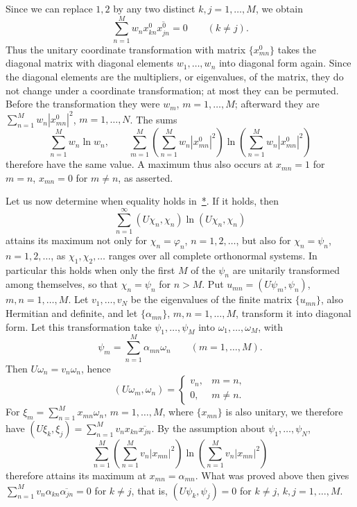 \documentclass[fontsize=13pt,twoside,openany,headings=normal,parskip=false,bookmarkpackage=false,DIV=calc]{scrbook}
\begin{document}
\hypertarget{origpage-205}{}%
Since we can replace $1,2$ by any two distinct $k,j=1,\ldots,M$, we obtain
\[
\sum_{n=1}^Mw_nx^0_{kn}\overline{x^0_{jn}}=0\qquad(k\ne j).
\]
Thus the unitary coordinate transformation with matrix $\{x^0_{mn}\}$ takes the diagonal matrix with diagonal elements $w_1,\ldots,w_n$ into diagonal form again. Since the diagonal elements are the multipliers, or eigenvalues, of the matrix, they do not change under a coordinate transformation; at most they can be permuted. Before the transformation they were $w_m$, $m=1,\ldots,M$; afterward they are $\sum_{n=1}^Mw_n|x^0_{mn}|^2$, $m=1,\ldots,N$. The sums
\[
\sum_{n=1}^Mw_n\ln w_n,\qquad
\sum_{m=1}^M\left(\sum_{n=1}^Mw_n|x^0_{mn}|^2\right)\ln\left(\sum_{n=1}^Mw_n|x^0_{mn}|^2\right)
\]
therefore have the same value. A maximum thus also occurs at $x_{mn}=1$ for $m=n$, $x_{mn}=0$ for $m\ne n$, as asserted.

Let us now determine when equality holds in~\hyperref[eq:V.3.star]{*}. If it holds, then
\[
\sum_{n=1}^{\infty}(U\chi_n,\chi_n)\ln(U\chi_n,\chi_n)
\]
attains its maximum not only for $\chi_n=\varphi_n$, $n=1,2,\ldots$, but also for $\chi_n=\psi_n$, $n=1,2,\ldots$, as $\chi_1,\chi_2,\ldots$ ranges over all complete orthonormal systems. In particular this holds when only the first $M$ of the $\psi_n$ are unitarily transformed among themselves, so that $\chi_n=\psi_n$ for $n>M$. Put $u_{mn}=(U\psi_m,\psi_n)$, $m,n=1,\ldots,M$. Let $v_1,\ldots,v_N$ be the eigenvalues of the finite matrix $\{u_{mn}\}$, also Hermitian and definite, and let $\{\alpha_{mn}\}$, $m,n=1,\ldots,M$, transform it into diagonal form. Let this transformation take $\psi_1,\ldots,\psi_M$ into $\omega_1,\ldots,\omega_M$, with
\[
\psi_m=\sum_{n=1}^M\alpha_{mn}\omega_n\qquad(m=1,\ldots,M).
\]
Then $U\omega_n=v_n\omega_n$, hence
\[
(U\omega_m,\omega_n)=\begin{cases}v_n,&m=n,\\0,&m\ne n.\end{cases}
\]
For $\xi_m=\sum_{n=1}^Mx_{mn}\omega_n$, $m=1,\ldots,M$, where $\{x_{mn}\}$ is also unitary, we therefore have $(U\xi_k,\xi_j)=\sum_{n=1}^Mv_nx_{kn}\overline{x_{jn}}$. By the assumption about $\psi_1,\ldots,\psi_N$,
\[
\sum_{n=1}^M\left(\sum_{n=1}^Mv_n|x_{mn}|^2\right)\ln\left(\sum_{n=1}^Mv_n|x_{mn}|^2\right)
\]
therefore attains its maximum at $x_{mn}=\alpha_{mn}$. What was proved above then gives $\sum_{n=1}^Mv_n\alpha_{kn}\overline{\alpha_{jn}}=0$ for $k\ne j$, that is, $(U\psi_k,\psi_j)=0$ for $k\ne j$, $k,j=1,\ldots,M$.
\end{document}
